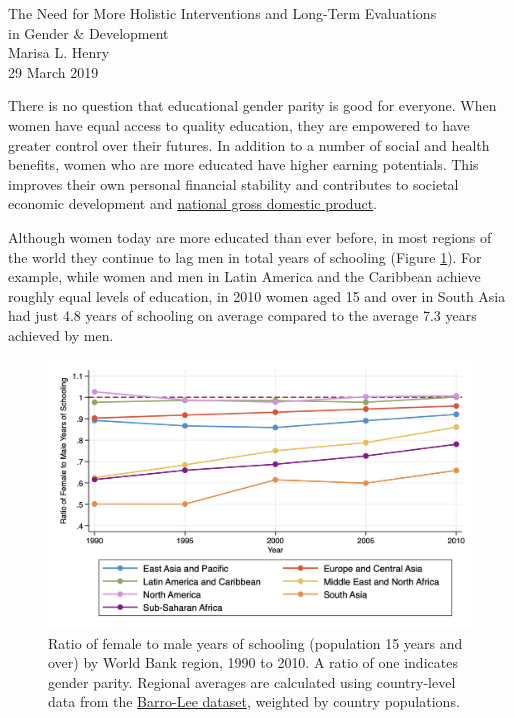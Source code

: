 \documentclass[11pt]{article}
\begin{document}
\begin{center} 
\Large The Need for More Holistic Interventions and Long-Term Evaluations \\ 
in Gender \& Development \\ 
\vspace{6 pt}
\normalsize Marisa L. Henry\\
29 March 2019
\end{center} 

\linespread{1.25}
There is no question that educational gender parity is good for everyone. When women have equal access to quality education, they are empowered to have greater control over their futures. In addition to a number of social and health benefits, women who are more educated have higher earning potentials. This improves their own personal financial stability and contributes to societal economic development and \href{https://www.economist.com/finance-and-economics/2015/09/24/the-power-of-parity}{national gross domestic product}. 

Although women today are more educated than ever before, in most regions of the world they continue to lag men in total years of schooling (Figure \ref{fig:yrschratio}). For example, while women and men in Latin America and the Caribbean achieve roughly equal levels of education, in 2010 women aged 15 and over in South Asia had just 4.8 years of schooling on average compared to the average 7.3 years achieved by men. 

\begin{figure}[h!]
	\centering
	\includegraphics[width=0.9 \linewidth]{yrsch_ratio.png}
	\caption{\small Ratio of female to male years of schooling (population 15 years and over) by World Bank region, 1990 to 2010. A ratio of one indicates gender parity. Regional averages are calculated using country-level data from the \href{http://www.barrolee.com/}{Barro-Lee dataset}, weighted by country populations.}
	\label{fig:yrschratio}
\end{figure}
\end{document}
